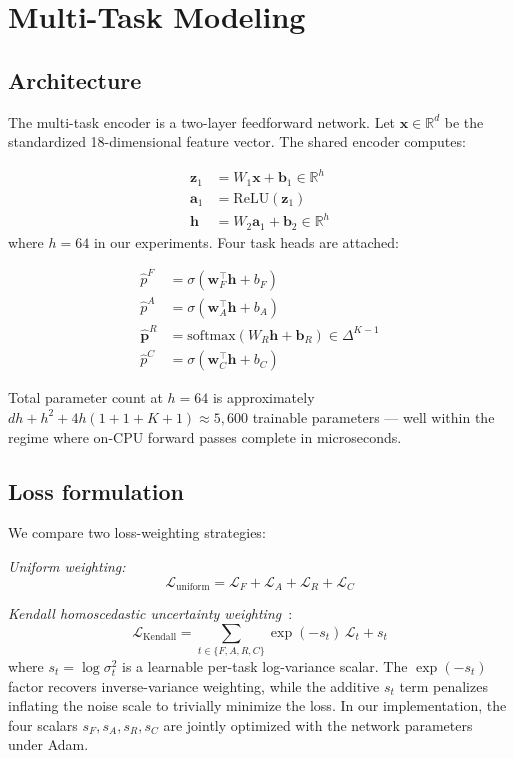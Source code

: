 \documentclass[11pt,a4paper]{article}
\begin{document}
\section{Multi-Task Modeling}
\label{sec:model}

\subsection{Architecture}
The multi-task encoder is a two-layer feedforward network. Let
$\mathbf{x} \in \mathbb{R}^{d}$ be the standardized 18-dimensional
feature vector. The shared encoder computes:

\begin{align}
    \mathbf{z}_1 &= W_1 \mathbf{x} + \mathbf{b}_1 \in \mathbb{R}^{h} \\
    \mathbf{a}_1 &= \mathrm{ReLU}(\mathbf{z}_1) \\
    \mathbf{h} &= W_2 \mathbf{a}_1 + \mathbf{b}_2 \in \mathbb{R}^{h}
\end{align}
where $h=64$ in our experiments. Four task heads are attached:

\begin{align}
    \hat{p}^{F} &= \sigma(\mathbf{w}_F^{\top} \mathbf{h} + b_F) \\
    \hat{p}^{A} &= \sigma(\mathbf{w}_A^{\top} \mathbf{h} + b_A) \\
    \hat{\mathbf{p}}^{R} &= \mathrm{softmax}(W_R \mathbf{h} + \mathbf{b}_R) \in \Delta^{K-1} \\
    \hat{p}^{C} &= \sigma(\mathbf{w}_C^{\top} \mathbf{h} + b_C)
\end{align}

Total parameter count at $h=64$ is approximately
$d h + h^2 + 4h(1+1+K+1) \approx 5{,}600$ trainable parameters --- well
within the regime where on-CPU forward passes complete in microseconds.

\subsection{Loss formulation}
We compare two loss-weighting strategies:

\textit{Uniform weighting:}
\begin{equation}
    \mathcal{L}_{\text{uniform}} = \mathcal{L}_F + \mathcal{L}_A + \mathcal{L}_R + \mathcal{L}_C
\end{equation}

\textit{Kendall homoscedastic uncertainty
weighting}~\cite{kendall2018}:
\begin{equation}
    \mathcal{L}_{\text{Kendall}} = \sum_{t \in \{F,A,R,C\}}
        \exp(-s_t)\,\mathcal{L}_t + s_t
    \label{eq:kendall}
\end{equation}
where $s_t = \log\sigma_t^{2}$ is a learnable per-task log-variance scalar.
The $\exp(-s_t)$ factor recovers inverse-variance weighting, while the
additive $s_t$ term penalizes inflating the noise scale to trivially
minimize the loss. In our implementation, the four scalars $s_F, s_A,
s_R, s_C$ are jointly optimized with the network parameters under Adam.
\end{document}
